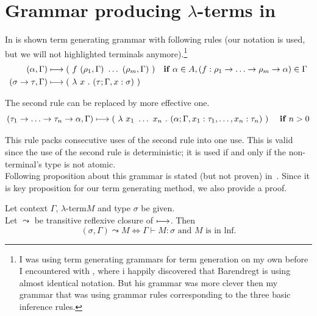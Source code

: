 \documentclass[12pt,a4paper]{report}
\newcommand{\lterm}{$\lambda$-term\xspace}
\newcommand{\lterms}{$\lambda$-terms\xspace}
\newcommand{\tur}[3]{#1\vdash{}#2:#3}
\begin{document}
\section{Grammar producing \lterms in \lnf}
\label{barlike}

In \cite{barendregt10} is shown term generating grammar with 
following rules (our notation is used, but we will not 
highlighted terminals anymore).\footnote{
I was using term generating grammars for term generation
on my own before I encountered with \cite{barendregt10},
where i happily discovered that Barendregt is using
almost identical notation. 
But his \lnf grammar was more clever then my grammar
that was using grammar rules corresponding to the three basic
inference rules. 
}
\begin{align*}
( \alpha , \Gamma )  
&\gar
(~f~( \rho_1 , \Gamma )~\dots~( \rho_m , \Gamma )~)
& \textbf{if } \alpha \in A,
(f : \rho_1 \ar \dots \ar \rho_m \ar \alpha) \in \Gamma
\\ 
( \sigma \rightarrow \tau , \Gamma )  
&\gar
(~\lambda~x~.~( \tau ; \Gamma,x:\sigma )~)
&   
\end{align*}

The second rule can be replaced by more effective one.
\[ 
( \tau_1 \ar \dots \ar \tau_n \ar \alpha , \Gamma )  
\gar
(~\lambda~x_1~\dots~x_n~.~
( \alpha ; \Gamma , x_1:\tau_1 , \dots , x_n:\tau_n  )~)
~~~~ \textbf{if } n > 0
\] 

This rule packs consecutive uses of the second rule into one use.
This is valid since the use of the second rule is deterministic;
it is used if and only if the non-terminal's type is not atomic.\\

Following proposition about this grammar is stated (but not proven)
in~\cite{barendregt10}. Since it is key proposition for our 
term generating method, we also provide a proof.


\newcommand{\garr}{\leadsto}%
\newcommand{\Gp}{\Gamma^\prime}

\begin{proposition}
\label{gram-lnf-prop}
Let context $\Gamma$, \lterm $M$ and type $\sigma$ be given.\\
Let $\garr$ be transitive reflexive closure of $\longmapsto$. 
Then
$$ 
(\sigma,\Gamma) \garr M 
\Leftrightarrow
\tur{\Gamma}{M}{\sigma} \text{ and $M$ is in lnf}.   
$$
\end{proposition}
\end{document}
